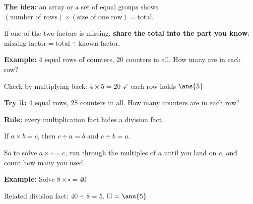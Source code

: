 \documentclass[12pt]{article}
\begin{document}


\begin{formulabox}
\textbf{The idea:} an array or a set of equal groups shows
$(\text{number of rows}) \times (\text{size of one row}) = \text{total}$.\par
If one of the two factors is missing, \textbf{share the total into the part you know}:
$\text{missing factor} = \text{total} \div \text{known factor}$.
\end{formulabox}

\begin{examplebox}
\textbf{Example:} \quad $4$ equal rows of counters, $20$ counters in all. How many are in each row?

Check by multiplying back: $4 \times 5 = 20$ $\checkmark$ \quad each row holds $\ans{5}$
\end{examplebox}

\begin{tryitbox}
\textbf{Try it:} \quad $4$ equal rows, $28$ counters in all. How many counters are in each row?\\[2pt]
\end{tryitbox}


\begin{formulabox}
\textbf{Rule:} every multiplication fact hides a division fact.\par
If $a \times b = c$, then $c \div a = b$ and $c \div b = a$.\par
So to solve $a \times \square = c$, run through the multiples of $a$ until you land on $c$, and count
how many you used.
\end{formulabox}

\begin{examplebox}
\textbf{Example:} \quad Solve $8 \times \square = 40$

Related division fact: $40 \div 8 = 5$. \quad $\square = \ans{5}$
\end{examplebox}
\end{document}
